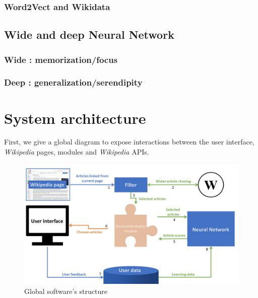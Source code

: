\documentclass[11pt]{article}
\theoremstyle{plain}
\theoremstyle{definition}
\theoremstyle{remark}
\begin{document}
\subsubsection{Word2Vect and Wikidata}

\subsection{Wide and deep Neural Network}
\subsubsection{Wide : memorization/focus}
\subsubsection{Deep : generalization/serendipity}


\newpage

\section{System architecture}

First, we give a global diagram to expose interactions between the user interface, \textit{Wikipedia} pages, modules and \textit{Wikipedia} APIs. 

\begin{figure}[h!]
	\centering
    \includegraphics[width=400pt]{diagram.png}
    \caption{Global software's structure}
    \label{arch_glo}
\end{figure}
\end{document}
